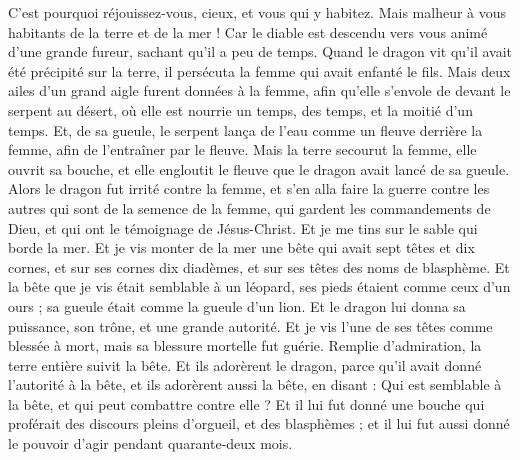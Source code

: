 \begin{multicols}{2}
C'est pourquoi réjouissez-vous, cieux, et vous qui y habitez. Mais malheur à vous habitants de la terre et de la mer ! Car le diable est descendu vers vous animé d'une grande fureur, sachant qu'il a peu de temps.
Quand le dragon vit qu'il avait été précipité sur la terre, il persécuta la femme qui avait enfanté le fils.
Mais deux ailes d'un grand aigle furent données à la femme, afin qu'elle s'envole de devant le serpent au désert, où elle est nourrie un temps, des temps, et la moitié d'un temps.
Et, de sa gueule, le serpent lança de l'eau comme un fleuve derrière la femme, afin de l'entraîner par le fleuve.
Mais la terre secourut la femme, elle ouvrit sa bouche, et elle engloutit le fleuve que le dragon avait lancé de sa gueule.
Alors le dragon fut irrité contre la femme, et s'en alla faire la guerre contre les autres qui sont de la semence de la femme, qui gardent les commandements de Dieu, et qui ont le témoignage de Jésus-Christ.
Et je me tins sur le sable qui borde la mer.
\VerseOne{}Et je vis monter de la mer une bête qui avait sept têtes et dix cornes, et sur ses cornes dix diadèmes, et sur ses têtes des noms de blasphème.
Et la bête que je vis était semblable à un léopard, ses pieds étaient comme ceux d'un ours ; sa gueule était comme la gueule d'un lion. Et le dragon lui donna sa puissance, son trône, et une grande autorité.
Et je vis l'une de ses têtes comme blessée à mort, mais sa blessure mortelle fut guérie. Remplie d'admiration, la terre entière suivit la bête.
Et ils adorèrent le dragon, parce qu'il avait donné l'autorité à la bête, et ils adorèrent aussi la bête, en disant : Qui est semblable à la bête, et qui peut combattre contre elle ?
Et il lui fut donné une bouche qui proférait des discours pleins d'orgueil, et des blasphèmes ; et il lui fut aussi donné le pouvoir d'agir pendant quarante-deux mois.

\end{multicols}
